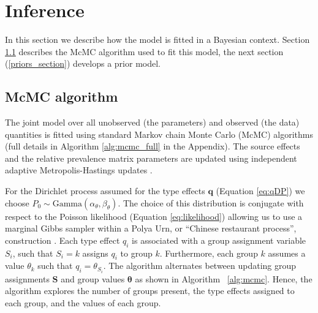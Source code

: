 \section{Inference}

In this section we describe how the model is fitted in a Bayesian context. Section \ref{mcmc_section} describes the McMC algorithm used to fit this model, the next section (\ref{priors_section}) develops a prior model.

\subsection{McMC algorithm} \label{mcmc_section}

The joint model over all unobserved (the parameters) and observed (the data) quantities is fitted using standard Markov chain Monte Carlo (McMC) algorithms (full details in Algorithm \ref{alg:mcmc_full} in the Appendix). The source effects and the 
relative prevalence matrix parameters 
are updated using independent adaptive Metropolis-Hastings updates \citep{RobRos06}. 

For the Dirichlet process assumed for the type effects $\bm{q}$ (Equation \ref{eq:qDP}) we choose $P_0 \sim \mbox{Gamma}(\alpha_\theta, \beta_\theta)$.  The choice of this distribution is conjugate 
with respect to the Poisson likelihood (Equation \ref{eq:likelihood}) allowing us to use a marginal Gibbs sampler within a Polya Urn, or  ``Chinese restaurant process'', construction \citep{GelCarSte13}.  Each type effect $q_i$ is associated with a group assignment variable $S_i$, such that $S_i = k$ assigns $q_i$ to group $k$.  Furthermore, each group $k$ assumes a value $\theta_k$ such that $q_i = \theta_{S_i}$.  The algorithm alternates between updating group assignments $\bm{S}$ and group values $\bm{\theta}$ as shown in Algorithm~ \ref{alg:mcmc}.  Hence, the algorithm explores the number of groups present, the type effects assigned to each group, and the values of each group.

